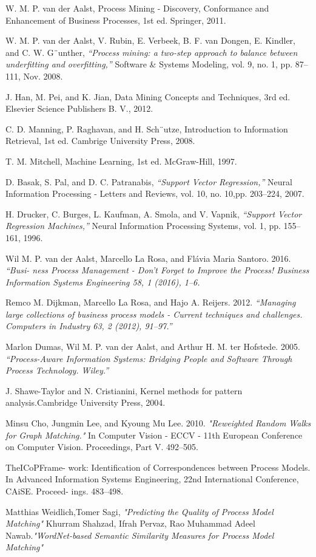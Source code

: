 \documentclass[runningheads]{llncs}
\begin{document}
\begin{thebibliography}{9}
W. M. P. van der Aalst, Process Mining - Discovery, Conformance
and Enhancement of Business Processes, 1st ed. Springer, 2011.

W. M. P. van der Aalst, V. Rubin, E. Verbeek, B. F. van Dongen,
E. Kindler, and C. W. G¨unther, \textit{“Process mining: a two-step approach to balance between underfitting and overfitting,”} Software \& Systems Modeling, vol. 9, no. 1, pp. 87–111, Nov. 2008.

J. Han, M. Pei, and K. Jian, Data Mining Concepts and Techniques,
3rd ed. Elsevier Science Publishers B. V., 2012.

C. D. Manning, P. Raghavan, and H. Sch¨utze, Introduction to Information Retrieval, 1st ed. Cambrige University Press, 2008.

T. M. Mitchell, Machine Learning, 1st ed. McGraw-Hill, 1997.

D. Basak, S. Pal, and D. C. Patranabis, \textit{“Support Vector Regression,”} Neural Information Processing - Letters and Reviews, vol. 10, no. 10,pp. 203–224, 2007.

H. Drucker, C. Burges, L. Kaufman, A. Smola, and V. Vapnik, \textit{“Support Vector Regression Machines,”} Neural Information Processing Systems, vol. 1, pp. 155–161, 1996.

Wil M. P. van der Aalst, Marcello La Rosa, and Flávia Maria Santoro. 2016. \textit{“Busi- ness Process Management - Don’t Forget to Improve the Process! Business  Information Systems Engineering 58, 1 (2016), 1–6.} 

Remco M. Dijkman, Marcello La Rosa, and Hajo A. Reijers. 2012.  \textit{“Managing large collections of business process models - Current techniques and challenges. Computers in Industry 63, 2 (2012), 91–97.”}

Marlon Dumas, Wil M. P. van der Aalst, and Arthur H. M. ter Hofstede. 2005. \textit{“Process-Aware Information Systems: Bridging People and Software Through Process
Technology. Wiley.”}

J. Shawe-Taylor and N. Cristianini, Kernel methods for pattern analysis.Cambridge University Press, 2004.

Minsu Cho, Jungmin Lee, and Kyoung Mu Lee. 2010. \textit{"Reweighted Random Walks for Graph Matching."} In Computer Vision - ECCV - 11th European Conference on Computer Vision. Proceedings, Part V. 492–505.


TheICoPFrame- work: Identification of Correspondences between Process Models. In Advanced Information Systems Engineering, 22nd International Conference, CAiSE. Proceed- ings. 483–498.

Matthias Weidlich,Tomer Sagi, \textit{"Predicting the Quality of Process Model Matching"}
Khurram Shahzad, Ifrah Pervaz, Rao Muhammad Adeel Nawab.\textit{"WordNet-based Semantic Similarity Measures for Process Model Matching"}
\end{thebibliography}
%
\end{document}
